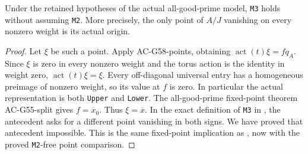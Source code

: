 \begin{theorem}
\label{AC-G58}
Under the retained hypotheses of the actual
all-good-prime model, \texttt{M3} holds without
assuming \texttt{M2}.
More precisely, the only point of $A/J$
vanishing on every nonzero weight is its
actual origin.
\end{theorem}
\begin{proof}
Let $\xi$ be such a point.
Apply AC-G58-points, obtaining
$\operatorname{act}(t)\xi=fq_A$.
Since $\xi$ is zero in every nonzero weight
and the torus action is the identity in
weight zero, $\operatorname{act}(t)\xi=\xi$.
Every off-diagonal universal entry has a
homogeneous preimage of nonzero weight,
so its value at $f$ is zero.
In particular the actual representation is
both \texttt{Upper} and \texttt{Lower}.
The all-good-prime fixed-point theorem
AC-G55-split gives $f=\overline x_0$.
Thus $\xi=\overline x$.
In the exact definition of \texttt{M3} in
,
the antecedent asks for a different point
vanishing in both signs.  We have proved
that antecedent impossible.
This is the same fixed-point implication as
,
now with the proved \texttt{M2}-free point
comparison.
\end{proof}

